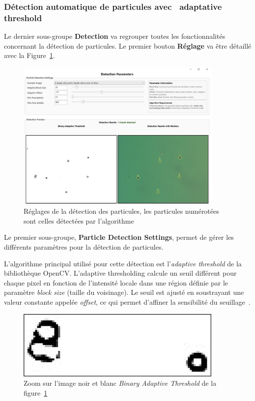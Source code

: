 \newpage
\subsubsection{Détection automatique de particules avec \guillemotleft~adaptative threshold~\guillemotright}
Le dernier sous-groupe \textbf{Detection} va regrouper toutes les fonctionnalités concernant la détection de particules. Le premier bouton \textbf{Réglage} va être détaillé avec la Figure~\ref{Settings_Detection}.
\begin{figure}[H]
    \centering
    \includegraphics[width=0.9\textwidth]{assets/figures/Application_ServoVision/Settings_Detection.jpeg}
    \caption{Réglages de la détection des particules, les particules numérotées sont celles détectées par l'algorithme}
    \label{Settings_Detection}
\end{figure}
Le premier sous-groupe, \textbf{Particle Detection Settings}, permet de gérer les différents paramètres pour la détection de particules.

L'algorithme principal utilisé pour cette détection est l'\textit{adaptive threshold} de la bibliothèque OpenCV. L'adaptive thresholding calcule un seuil différent pour chaque pixel en fonction de l'intensité locale dans une région définie par le paramètre  \textit{block size} (taille du voisinage). Le seuil est ajusté en soustrayant une valeur constante appelée \textit{offset}, ce qui permet d'affiner la sensibilité du seuillage~\cite{OpenCVadaptativeThreshold}.
\newpage
\begin{figure}[H]
    \centering
    \includegraphics[width=0.9\textwidth]{assets/figures/Application_ServoVision/Settings_Detection_zoom.png}
    \caption{Zoom sur l'image noir et blanc \textit{Binary Adaptive Threshold} de la figure~\ref{Settings_Detection}}
    \label{Settings_Camera_zoom}
\end{figure}

